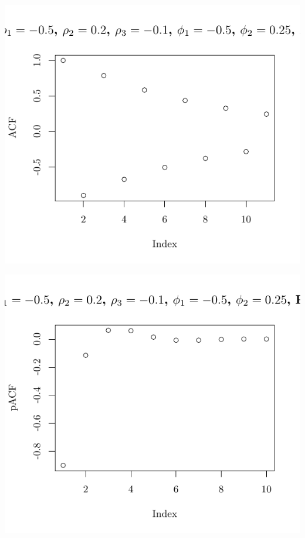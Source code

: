 \documentclass[10pt]{paper}\usepackage[]{graphicx}\usepackage[]{color}
\makeatletter
\def\maxwidth{ %
  \ifdim\Gin@nat@width>\linewidth
    \linewidth
  \else
    \Gin@nat@width
  \fi
}
\newenvironment{knitrout}{}{} %
\makeatother
\begin{document}
\begin{knitrout}
{\centering \includegraphics[width=\maxwidth]{figure/graphics-plotter-163} 

}




{\centering \includegraphics[width=\maxwidth]{figure/graphics-plotter-164} 

}





\end{knitrout}
\end{document}
